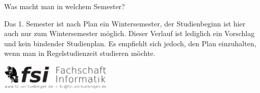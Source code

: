 \begin{block}{Was macht man in welchem Semester?}
\begin{figure}[h!]
{\begin{minipage}{\textwidth}
        \end{minipage}}  
    \end{figure}
    
    Das 1. Semester ist nach Plan ein Wintersemester, der Studienbeginn ist hier auch nur zum Wintersemester möglich. 
    Dieser Verlauf ist lediglich ein Vorschlag und kein bindender Studienplan. Es empfiehlt sich jedoch, den Plan einzuhalten, wenn man in Regelstudienzeit studieren möchte.
\end{block}

\vfill
\begin{flushright}
    \includegraphics[width=0.4\textwidth]{images/fsilogo.pdf}
\end{flushright}